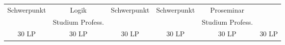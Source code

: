 \begin{table}[htbp]
{\begin{tabular}{|cccccc|}
			\multicolumn{1}{|c|}{Schwerpunkt}      & \multicolumn{1}{c|}{Logik}            & \multicolumn{1}{c|}{Schwerpunkt}      & \multicolumn{1}{c|}{Schwerpunkt}   & \multicolumn{1}{c|}{Proseminar}       &                \\ \cline{2-2} \cline{5-5}
			\multicolumn{1}{|c|}{}                 & \multicolumn{1}{c|}{Studium Profess.} & \multicolumn{1}{c|}{}                 & \multicolumn{1}{c|}{}              & \multicolumn{1}{c|}{Studium Profess.} &                \\ \hline
			30 LP                                  & 30 LP                                 & 30 LP                                 & 30 LP                              & 30 LP                                 & 30 LP          \\ \hline
		\end{tabular}}
\end{table}